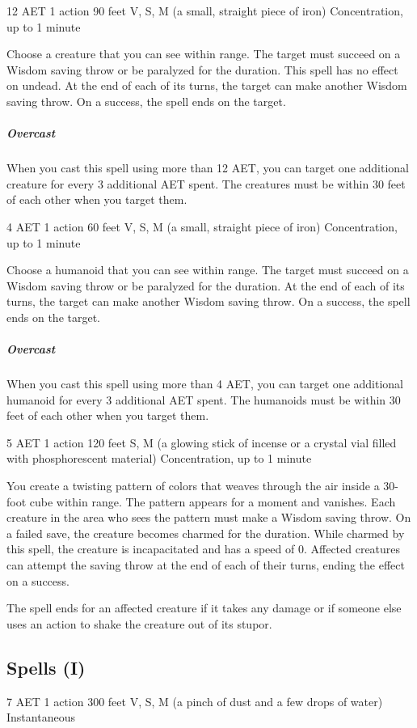 \label{spell:hold-monster}
{12 AET}
{1 action}
{90 feet}
{V, S, M (a small, straight piece of iron)}
{Concentration, up to 1 minute}

Choose a creature that you can see within range. The target must succeed on a Wisdom saving throw or be paralyzed for the duration. This spell has no effect on undead. At the end of each of its turns, the target can make another Wisdom saving throw. On a success, the spell ends on the target.
\subparagraph*{Overcast} When you cast this spell using more than 12 AET, you can target one additional creature for every 3 additional AET spent. The creatures must be within 30 feet of each other when you target them.

\label{spell:hold-person}
{4 AET}
{1 action}
{60 feet}
{V, S, M (a small, straight piece of iron)}
{Concentration, up to 1 minute}

Choose a humanoid that you can see within range. The target must succeed on a Wisdom saving throw or be paralyzed for the duration. At the end of each of its turns, the target can make another Wisdom saving throw. On a success, the spell ends on the target.
\subparagraph*{Overcast} When you cast this spell using more than 4 AET, you can target one additional humanoid for every 3 additional AET spent. The humanoids must be within 30 feet of each other when you target them.

\label{spell:hypnotic-pattern}
{5 AET}
{1 action}
{120 feet}
{S, M (a glowing stick of incense or a crystal vial filled with phosphorescent material)}
{Concentration, up to 1 minute}

You create a twisting pattern of colors that weaves through the air inside a 30-foot cube within range. The pattern appears for a moment and vanishes. Each creature in the area who sees the pattern must make a Wisdom saving throw. On a failed save, the creature becomes charmed for the duration. While charmed by this spell, the creature is incapacitated and has a speed of 0. Affected creatures can attempt the saving throw at the end of each of their turns, ending the effect on a success.

The spell ends for an affected creature if it takes any damage or if someone else uses an action to shake the creature out of its stupor.

\subsection{Spells (I)}
\label{spell:ice-storm}
{7 AET}
{1 action}
{300 feet}
{V, S, M (a pinch of dust and a few drops of water)}
{Instantaneous}

